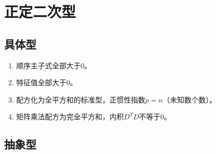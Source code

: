 \documentclass[UTF8, 12pt]{ctexart}
\begin{document}
\section{正定二次型}

\subsection{具体型}

\begin{enumerate}
    \item 顺序主子式全部大于0。
    \item 特征值全部大于0。
    \item 配方化为全平方和的标准型，正惯性指数$p=n$（未知数个数）。
    \item 矩阵乘法配方为完全平方和，内积$D^TD$不等于0。
\end{enumerate}

\subsection{抽象型}
\end{document}
